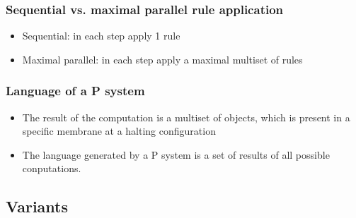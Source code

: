 


    \begin{frame}[t]\frametitle{Sequential vs. maximal parallel rule application}
      \begin{itemize}
        \item Sequential: in each step apply 1 rule
        \item Maximal parallel: in each step apply a maximal multiset of rules
      \end{itemize}
      \simulationpicture
    \end{frame}
    \note{}

    \begin{frame}[t]\frametitle{Language of a P system}
      \begin{itemize}
        \item The result of the computation is a multiset of objects, which is present in a specific membrane at a halting configuration
        \item The language generated by a P system is a set of results of all possible conputations.
      \end{itemize}
    \end{frame}
    \note{}
    \newpage
    \note{}


  \subsection{Variants} %
  \label{sub:variants}

